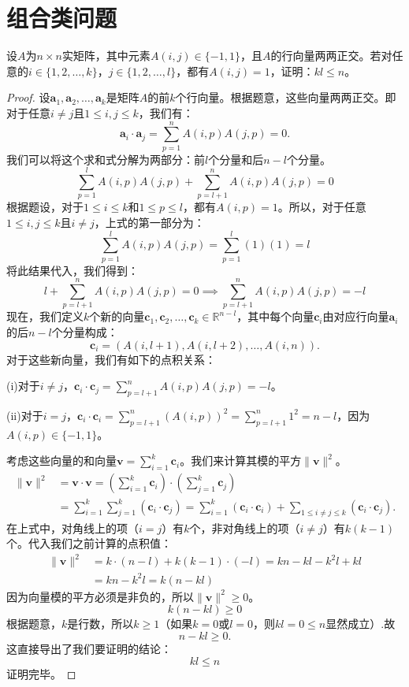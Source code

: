 \documentclass[../../main.tex]{subfiles}
\begin{document}
\section{组合类问题}

\begin{example}
设$A$为$n \times n$实矩阵，其中元素$A(i,j) \in \{-1,1\}$，且$A$的行向量两两正交。若对任意的$i \in \{1,2,\ldots,k\}$，$j \in \{1,2,\ldots,l\}$，都有$A(i,j) = 1$，证明：$kl \leqslant n$。
\end{example}
\begin{proof}
设$\mathbf{a}_1, \mathbf{a}_2, \ldots, \mathbf{a}_k$是矩阵$A$的前$k$个行向量。根据题意，这些向量两两正交。即对于任意$i \neq j$且$1 \leq i, j \leq k$，我们有：
\[
\mathbf{a}_i \cdot \mathbf{a}_j = \sum_{p=1}^n A(i, p)A(j, p) = 0.
\]
我们可以将这个求和式分解为两部分：前$l$个分量和后$n - l$个分量。
\[
\sum_{p=1}^l A(i, p)A(j, p) + \sum_{p=l+1}^n A(i, p)A(j, p) = 0 
\]
根据题设，对于$1 \leq i \leq k$和$1 \leq p \leq l$，都有$A(i, p) = 1$。所以，对于任意$1 \leq i, j \leq k$且$i \neq j$，上式的第一部分为：
\[
\sum_{p=1}^l A(i, p)A(j, p) = \sum_{p=1}^l (1)(1) = l 
\]
将此结果代入，我们得到：
\[
l + \sum_{p=l+1}^n A(i, p)A(j, p) = 0 \implies \sum_{p=l+1}^n A(i, p)A(j, p) = -l 
\]
现在，我们定义$k$个新的向量$\mathbf{c}_1, \mathbf{c}_2, \ldots, \mathbf{c}_k \in \mathbb{R}^{n - l}$，其中每个向量$\mathbf{c}_i$由对应行向量$\mathbf{a}_i$的后$n - l$个分量构成：
\[
\mathbf{c}_i = (A(i, l + 1), A(i, l + 2), \ldots, A(i, n)).
\]
对于这些新向量，我们有如下的点积关系：

(i)对于$i \neq j$，$\mathbf{c}_i \cdot \mathbf{c}_j = \sum_{p=l+1}^n A(i, p)A(j, p) = -l$。

(ii)对于$i = j$，$\mathbf{c}_i \cdot \mathbf{c}_i = \sum_{p=l+1}^n (A(i, p))^2 = \sum_{p=l+1}^n 1^2 = n - l$，因为$A(i, p) \in \{-1, 1\}$。

考虑这些向量的和向量$\mathbf{v} = \sum_{i=1}^k \mathbf{c}_i$。我们来计算其模的平方$\|\mathbf{v}\|^2$。
\begin{align*}
\|\mathbf{v}\|^2 &= \mathbf{v} \cdot \mathbf{v} = \left( \sum_{i=1}^k \mathbf{c}_i \right) \cdot \left( \sum_{j=1}^k \mathbf{c}_j \right) \\
&= \sum_{i=1}^k \sum_{j=1}^k (\mathbf{c}_i \cdot \mathbf{c}_j)= \sum_{i=1}^k (\mathbf{c}_i \cdot \mathbf{c}_i) + \sum_{1 \leq i \neq j \leq k} (\mathbf{c}_i \cdot \mathbf{c}_j).
\end{align*}
在上式中，对角线上的项（$i = j$）有$k$个，非对角线上的项（$i \neq j$）有$k(k - 1)$个。代入我们之前计算的点积值：
\begin{align*}
\|\mathbf{v}\|^2 &= k \cdot (n - l) + k(k - 1) \cdot (-l) = kn - kl - k^2 l + kl \\
&= kn - k^2 l = k(n - kl)
\end{align*}
因为向量模的平方必须是非负的，所以$\|\mathbf{v}\|^2 \geq 0$。
\[
k(n - kl) \geqslant 0
\]
根据题意，$k$是行数，所以$k \geq 1$（如果$k = 0$或$l = 0$，则$kl = 0 \leq n$显然成立）.故
\[
n - kl \geqslant 0.
\]
这直接导出了我们要证明的结论：
\[
kl \leq n \label{eq:12}
\]
证明完毕。
\end{proof}
\end{document}
